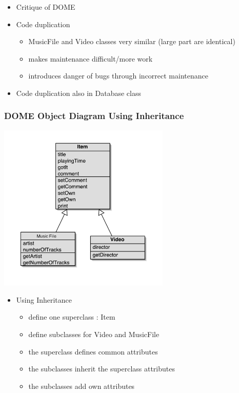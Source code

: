 \documentclass{beamer}
\begin{document}
\begin{frame}
\begin{itemize}
\item Critique of DOME
\end{itemize}
\begin{itemize}
\item Code duplication
\begin{itemize}
\item MusicFile and Video classes very similar (large part are identical)
\item makes maintenance difficult/more work
\item introduces danger of bugs through incorrect maintenance
\end{itemize}
\item Code duplication also in Database class 
\end{itemize}
\end{frame}

\begin{frame}
\frametitle{DOME Object Diagram Using Inheritance}
\begin{center}
\includegraphics[height=8cm, keepaspectratio]{images/inheritance}
\end{center}
\end{frame}

\begin{frame}
\begin{itemize}
\item Using Inheritance
\begin{itemize}
\item define one superclass : Item
\item define subclasses for Video and MusicFile
\item the superclass defines common attributes
\item the subclasses inherit the superclass attributes
\item the subclasses add own attributes
\end{itemize}
\end{itemize}
\end{frame}
\end{document}
